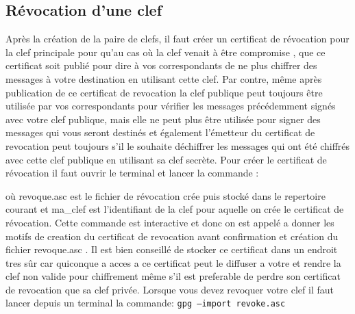  
\subsection {Révocation d'une clef}
 Après la création de la paire de clefs, il faut créer un certificat de révocation pour la clef principale pour qu'au cas où la clef
venait à être compromise , que ce certificat soit publié pour dire à vos correspondants de ne plus chiffrer des messages à votre
destination en utilisant cette  clef. Par contre, même après publication de ce certificat de revocation la clef publique peut toujours 
être utilisée par vos correspondants pour vérifier les messages précédemment signés avec votre clef publique, mais elle ne peut plus 
être utilisée pour signer des messages qui vous seront destinés et également l'émetteur du certificat de revocation peut toujours 
s'il  le souhaite déchiffrer les messages qui ont été chiffrés avec cette clef publique en utilisant sa clef secrète.
Pour créer le certificat de révocation il faut ouvrir le terminal et lancer la commande : 

où revoque.asc est le fichier de révocation crée puis stocké dans le repertoire courant et ma\_clef est l'identifiant de la clef pour
aquelle on crée le certificat de révocation.
Cette commande est interactive et donc on est appelé a donner les motifs de creation du certificat de revocation avant confirmation et 
création du fichier revoque.asc .
Il est bien conseillé de stocker ce certificat dans un endroit tres sûr car quiconque a acces a ce certificat peut le diffuser a votre 
et rendre la clef non valide pour chiffrement même s'il est preferable de perdre son certificat de revocation que sa clef privée.
Lorsque vous devez revoquer votre clef il faut lancer depuis un terminal la commande:
\texttt{gpg --import revoke.asc } \\


